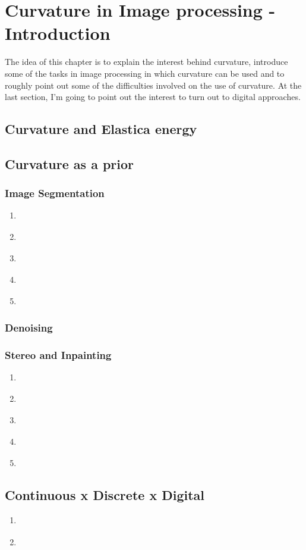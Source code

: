 \chapter{Curvature in Image processing - Introduction}

The idea of this chapter is to explain the interest behind curvature, introduce some of the tasks in image processing in which curvature can be used and to roughly point out some of the difficulties involved on the use of curvature. At the last section, I'm going to point out the interest to turn out to digital approaches.

\section{Curvature and Elastica energy}

\section{Curvature as a prior}

\subsection{Image Segmentation}
	\begin{enumerate}
		\item{ \cite{geman84} }			
		\item{ \cite{kass88} }		
		\item{ \cite{caselles97} }		
		\item{ \cite{chan01} }		
		\item{ \cite{boykov01} }		
	\end{enumerate}

\subsection{Denoising}	

\subsection{Stereo and Inpainting}	
	\begin{enumerate}
		\item{ \cite{mumford94} }	
		\item{ \cite{masnou98} }
		\item{ \cite{masnou02} }		
		\item{ \cite{ambrosio03} }		
		\item{ \cite{shen03} }
	\end{enumerate}
	

\section{Continuous x Discrete x Digital}
\begin{enumerate}
		\item{ \cite{mumford89} }
		\item{ \cite{bar15} } 
\end{enumerate}